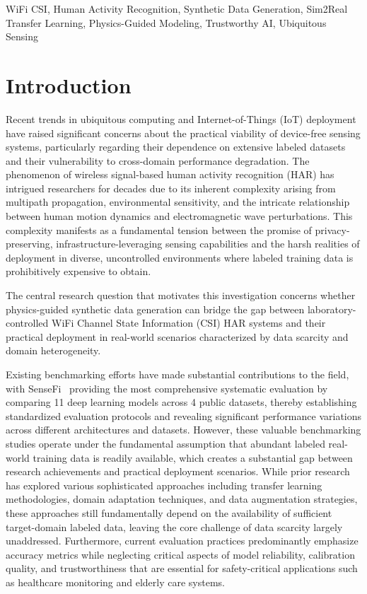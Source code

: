\documentclass[journal]{IEEEtran}
\begin{document}
\begin{IEEEkeywords}
WiFi CSI, Human Activity Recognition, Synthetic Data Generation, Sim2Real Transfer Learning, Physics-Guided Modeling, Trustworthy AI, Ubiquitous Sensing
\end{IEEEkeywords}

\section{Introduction}

Recent trends in ubiquitous computing and Internet-of-Things (IoT) deployment have raised significant concerns about the practical viability of device-free sensing systems, particularly regarding their dependence on extensive labeled datasets and their vulnerability to cross-domain performance degradation. The phenomenon of wireless signal-based human activity recognition (HAR) has intrigued researchers for decades due to its inherent complexity arising from multipath propagation, environmental sensitivity, and the intricate relationship between human motion dynamics and electromagnetic wave perturbations. This complexity manifests as a fundamental tension between the promise of privacy-preserving, infrastructure-leveraging sensing capabilities and the harsh realities of deployment in diverse, uncontrolled environments where labeled training data is prohibitively expensive to obtain.

The central research question that motivates this investigation concerns whether physics-guided synthetic data generation can bridge the gap between laboratory-controlled WiFi Channel State Information (CSI) HAR systems and their practical deployment in real-world scenarios characterized by data scarcity and domain heterogeneity.

Existing benchmarking efforts have made substantial contributions to the field, with SenseFi~\cite{yang2023sensefi} providing the most comprehensive systematic evaluation by comparing 11 deep learning models across 4 public datasets, thereby establishing standardized evaluation protocols and revealing significant performance variations across different architectures and datasets. However, these valuable benchmarking studies operate under the fundamental assumption that abundant labeled real-world training data is readily available, which creates a substantial gap between research achievements and practical deployment scenarios. While prior research has explored various sophisticated approaches including transfer learning methodologies, domain adaptation techniques, and data augmentation strategies, these approaches still fundamentally depend on the availability of sufficient target-domain labeled data, leaving the core challenge of data scarcity largely unaddressed. Furthermore, current evaluation practices predominantly emphasize accuracy metrics while neglecting critical aspects of model reliability, calibration quality, and trustworthiness that are essential for safety-critical applications such as healthcare monitoring and elderly care systems.
\end{document}

